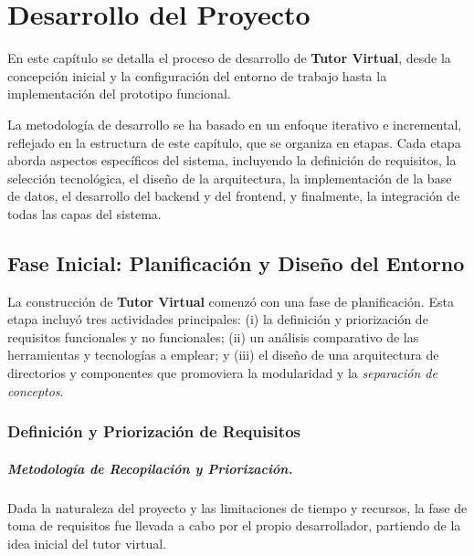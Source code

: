 \chapter{Desarrollo del Proyecto}
\label{chap:desarrollo}
\justifying

En este capítulo se detalla el proceso de desarrollo de \textbf{Tutor Virtual}, desde la concepción inicial y la configuración del entorno de trabajo hasta la implementación del prototipo funcional.

La metodología de desarrollo se ha basado en un enfoque iterativo e incremental, reflejado en la estructura de este capítulo, que se organiza en etapas. Cada etapa aborda aspectos específicos del sistema, incluyendo la definición de requisitos, la selección tecnológica, el diseño de la arquitectura, la implementación de la base de datos, el desarrollo del backend y del frontend, y finalmente, la integración de todas las capas del sistema.

\section{Fase Inicial: Planificación y Diseño del Entorno}
\label{sec:desarrollo_entorno}

La construcción de \textbf{Tutor Virtual} comenzó con una fase de planificación. Esta etapa incluyó tres actividades principales: (i) la definición y priorización de requisitos funcionales y no funcionales; (ii) un análisis comparativo de las herramientas y tecnologías a emplear; y (iii) el diseño de una arquitectura de directorios y componentes que promoviera la modularidad y la \emph{separación de conceptos}.

\subsection{Definición y Priorización de Requisitos}
\label{ssec:desarrollo_reqs}

\paragraph{Metodología de Recopilación y Priorización.}
Dada la naturaleza del proyecto y las limitaciones de tiempo y recursos, la fase de toma de requisitos fue llevada a cabo por el propio desarrollador, partiendo de la idea inicial del tutor virtual.

